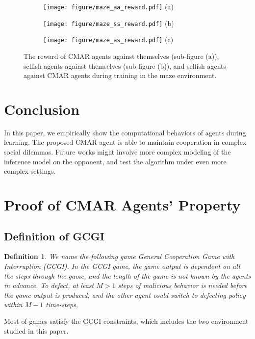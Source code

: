 \documentclass{article}
\newtheorem{definition}{Definition}
\begin{document}
\begin{figure}
\begin{subfigure}{.33\textwidth}
\centering
\texttt{[image: figure/maze\_aa\_reward.pdf]}
(a)
\end{subfigure}
\begin{subfigure}{.33\textwidth}
\centering
\texttt{[image: figure/maze\_ss\_reward.pdf]}
(b)
\end{subfigure}
\begin{subfigure}{.33\textwidth}
\centering
\texttt{[image: figure/maze\_as\_reward.pdf]}
(c)
\end{subfigure}
    \caption{
The reward of CMAR agents against themselves (sub-figure (a)),
selfish agents against themselves (sub-figure (b)),
    and selfish agents against CMAR agents during training in the maze environment.}
\label{fig:maze}
\end{figure}
\section{Conclusion}
In this paper, we empirically show the computational behaviors of agents during learning.
The proposed CMAR agent is able to maintain cooperation in complex social dilemmas.
Future works might involve more complex modeling of the inference model on the opponent,
and test the algorithm under even more complex settings.


\newpage
\appendix
\section{Proof of CMAR Agents' Property}
\subsection{Definition of GCGI}
\begin{definition}\label{appd1}
We name the following game \emph{General Cooperation Game with Interruption (GCGI)}.
In the GCGI game, the game output is dependent on all the steps through the game,
    and the length of the game is not known by the agents in advance.
    To defect,
    at least \(M>1\) steps of malicious behavior is needed before the game output is produced,
    and the other agent could switch to defecting policy within \(M - 1\) time-steps,
\end{definition}
Most of games satisfy the GCGI constraints,
which includes the two environment studied in this paper.
\end{document}
